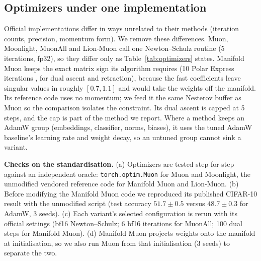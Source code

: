 \subsection{Optimizers under one implementation}

Official implementations differ in ways unrelated to their methods (iteration counts,
precision, momentum form). We remove these differences. Muon, Moonlight, MuonAll and Lion-Muon
call one Newton--Schulz routine (5 iterations, fp32), so
they differ only as Table~\ref{tab:optimizers} states. Manifold Muon keeps the exact matrix sign
its algorithm requires (10 Polar Express iterations \citep{amsel2025polar}, for dual ascent and
retraction), because the fast coefficients leave singular values in roughly $[0.7,1.1]$ and
would take the weights off the manifold. Its reference code uses no momentum; we feed it the
same Nesterov buffer as Muon so the comparison isolates the constraint. Its dual ascent is capped
at 5 steps, and the cap is part of the method we report. Where a method
keeps an AdamW group (embeddings, classifier, norms, biases), it uses the tuned AdamW
baseline's learning rate and weight decay, so an untuned group cannot sink a variant.

\textbf{Checks on the standardisation.} (a) Optimizers are tested step-for-step against an
independent oracle: \texttt{torch.optim.Muon} for Muon and Moonlight, the unmodified vendored
reference code for Manifold Muon and Lion-Muon. (b) Before modifying the Manifold Muon code we
reproduced its published CIFAR-10 result with the unmodified script (test accuracy
$51.7\pm0.5$ versus $48.7\pm0.3$ for AdamW, 3 seeds). (c) Each variant's selected configuration
is rerun with its official settings (bf16 Newton--Schulz; 6 bf16 iterations for MuonAll; 100
dual steps for Manifold Muon). (d) Manifold Muon projects weights onto the manifold at
initialisation, so we also run Muon from that initialisation (3 seeds) to separate the two.

